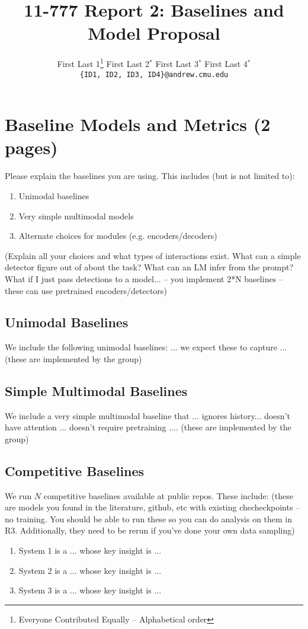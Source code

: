 \documentclass[11pt,a4paper]{article}
\title{11-777 Report 2: Baselines and Model Proposal}
\author{
  First Last 1\thanks{\hspace{4pt}Everyone Contributed Equally -- Alphabetical order} \hspace{2em} First Last 2$^*$ \hspace{2em} First Last 3$^*$ \hspace{2em} First Last 4$^*$ \\
  \texttt{\{ID1, ID2, ID3, ID4\}@andrew.cmu.edu}
  }
\date{}
\begin{document}
\maketitle

\section{Baseline Models and Metrics (2 pages)}
Please explain the baselines you are using. This includes (but is not limited to):
\begin{enumerate}
  \item Unimodal baselines
  \item Very simple multimodal models  
  \item Alternate choices for modules (e.g. encoders/decoders)
\end{enumerate}

(Explain all your choices and what types of interactions exist. What can a simple detector figure out of about the task? What can an LM infer from the prompt? What if I just pass detections to a model... -- you implement 2*N baselines -- these can use pretrained encoders/detectors)

\subsection{Unimodal Baselines}
We include the following unimodal baselines: ... we expect these to capture ... (these are implemented by the group)

\subsection{Simple Multimodal Baselines}
We include a very simple multimodal baseline that ... ignores history... doesn't have attention ... doesn't require pretraining ....
(these are implemented by the group)

\subsection{Competitive Baselines}
We run $N$ competitive baselines available at public repos.  These include: 
(these are models you found in the literature, github, etc with existing checheckpoints -- no training. You should be able to run these so you can do analysis on them in R3.  Additionally, they need to be rerun if you've done your own data sampling)

\begin{enumerate}
  \item System 1 is a ... whose key insight is ... 
  \item System 2 is a ... whose key insight is ... 
  \item System 3 is a ... whose key insight is ... 
\end{enumerate}
\end{document}
